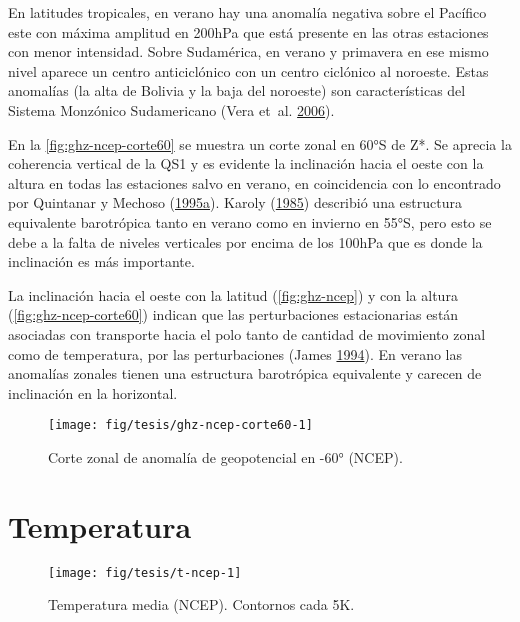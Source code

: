 \documentclass[spanish,a4paper,12p]{book}
\begin{document}
En latitudes tropicales, en verano hay una anomalía negativa sobre el
Pacífico este con máxima amplitud en 200hPa que está presente en las
otras estaciones con menor intensidad. Sobre Sudamérica, en verano y
primavera en ese mismo nivel aparece un centro anticiclónico con un
centro ciclónico al noroeste. Estas anomalías (la alta de Bolivia y la
baja del noroeste) son características del Sistema Monzónico
Sudamericano (Vera et~al. \protect\hyperlink{ref-Vera2006}{2006}).

En la \autoref{fig:ghz-ncep-corte60} se muestra un corte zonal en 60°S
de Z*. Se aprecia la coherencia vertical de la QS1 y es evidente la
inclinación hacia el oeste con la altura en todas las estaciones salvo
en verano, en coincidencia con lo encontrado por Quintanar y Mechoso
(\protect\hyperlink{ref-Quintanar1995a}{1995}\protect\hyperlink{ref-Quintanar1995a}{a}).
Karoly (\protect\hyperlink{ref-Karoly1985}{1985}) describió una
estructura equivalente barotrópica tanto en verano como en invierno en
55°S, pero esto se debe a la falta de niveles verticales por encima de
los 100hPa que es donde la inclinación es más importante.

La inclinación hacia el oeste con la latitud (\autoref{fig:ghz-ncep}) y
con la altura (\autoref{fig:ghz-ncep-corte60}) indican que las
perturbaciones estacionarias están asociadas con transporte hacia el
polo tanto de cantidad de movimiento zonal como de temperatura, por las
perturbaciones (James \protect\hyperlink{ref-James}{1994}). En verano
las anomalías zonales tienen una estructura barotrópica equivalente y
carecen de inclinación en la horizontal.

\begin{figure*}
\texttt{[image: fig/tesis/ghz-ncep-corte60-1]} \caption{Corte zonal de anomalía de geopotencial en -60° (NCEP).}\label{fig:ghz-ncep-corte60}
\end{figure*}

\section{Temperatura}\label{temperatura}

\begin{landscape}\begin{figure}

{\centering \texttt{[image: fig/tesis/t-ncep-1]} 

}

\caption{Temperatura media (NCEP). Contornos cada 5K.}\label{fig:t-ncep}
\end{figure}
\end{landscape}
\end{document}
